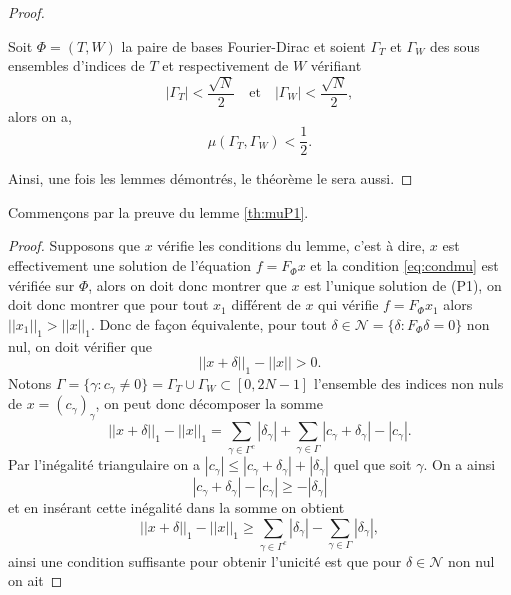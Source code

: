 \begin{proof}
\begin{lemme}
		Soit $\Phi=(T,W)$ la paire de bases Fourier-Dirac et soient $\Gamma_T$  et $\Gamma_W$ des sous ensembles d'indices de $T$ et respectivement de $W$ vérifiant
		\begin{equation}
			|\Gamma_T| < \frac{\sqrt{N}}{2} \quad \text{et} \quad |\Gamma_W| < \frac{\sqrt{N}}{2},
		\end{equation}
		alors on a,
		\begin{equation}
			\mu(\Gamma_T, \Gamma_W) < \frac{1}{2}.
		\end{equation}
	\end{lemme}
	Ainsi, une fois les lemmes démontrés, le théorème le sera aussi.
	\end{proof}
	Commençons par la preuve du lemme \ref{th:muP1}.
	\begin{proof}
		Supposons que $x$ vérifie les conditions du lemme, c'est à dire, $x$ est effectivement une solution de l'équation $f=F_\Phi x$ et la condition \ref{eq:condmu} est vérifiée sur $\Phi$, alors on doit donc montrer que $x$ est l'unique solution de (P1), on doit donc montrer que pour tout $x_1$ différent de $x$ qui vérifie $f = F_\Phi x_1$ alors $||x_1||_1 > ||x||_1$. 
		Donc de façon équivalente, pour tout $\delta \in \mathcal{N} = \{\delta : F_\Phi \delta = 0\}$ non nul, on doit vérifier que
		\begin{equation}\label{eq:ineqdelta3}
			||x + \delta||_1 - ||x|| > 0.
		\end{equation}
		Notons $\Gamma = \{\gamma : c_\gamma \neq 0\} = \Gamma_T \cup \Gamma_W \subset [0, 2N-1]$ l'ensemble des indices non nuls de $x = (c_\gamma)_\gamma$, 
		on peut donc décomposer la somme
		\begin{equation}
			||x + \delta||_1 - ||x||_1 = \sum_{\gamma \in \Gamma^c} |\delta_\gamma| + \sum_{\gamma \in \Gamma} |c_\gamma + \delta_\gamma| - |c_\gamma|.
		\end{equation}
		Par l'inégalité triangulaire on a $|c_\gamma| \leq |c_\gamma + \delta_\gamma| + |\delta_\gamma|$ quel que soit $\gamma$.
		On a ainsi 
		\begin{equation}
			|c_\gamma + \delta_\gamma| - |c_\gamma| \geq -|\delta_\gamma|
		\end{equation}
		et en insérant cette inégalité dans la somme on obtient
		\begin{equation}
			||x + \delta||_1 - ||x||_1 \geq \sum_{\gamma \in \Gamma^c} |\delta_\gamma| - \sum_{\gamma \in \Gamma} |\delta_\gamma|,
		\end{equation}
		ainsi une condition suffisante pour obtenir l'unicité est que pour $\delta \in \mathcal{N}$ non nul on ait

\end{proof}
